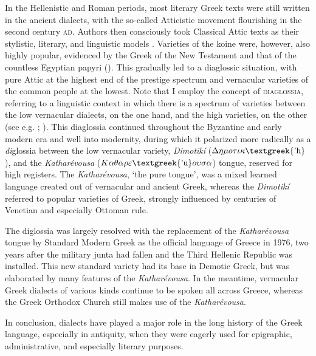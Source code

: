 \documentclass[output=paper]{langsci/langscibook}
\begin{document}
In the Hellenistic and Roman periods, most literary Greek texts were still written in the ancient dialects, with the so-called Atticistic movement flourishing in the second century \textsc{ad}. Authors then consciously took Classical Attic texts as their stylistic, literary, and linguistic models \citep[42]{Whitmarsh2005}. Varieties of the koine were, however, also highly popular, evidenced by the Greek of the New Testament and that of the countless Egyptian papyri (\citealt{EvansObbink2010}). This gradually led to a diaglossic situation, with pure Attic at the highest end of the prestige spectrum and vernacular varieties of the common people at the lowest. Note that I employ the concept of \textsc{diaglossia}, referring to a linguistic context in which there is a spectrum of varieties between the low vernacular dialects, on the one hand, and the high varieties, on the other (see e.g. \citealt{Auer2005}; \citealt{Rutten2016}). This diaglossia continued throughout the Byzantine and early modern era and well into modernity, during which it polarized more radically as a \textit{di}glossia between the low vernacular variety, \textit{Dimotikí} ($\Delta \eta \mu o\tau \iota \kappa \text{\textgreek{'h}}$), and the \textit{Katharévousa} ($K\alpha \theta \alpha \rho \varepsilon \text{\textgreek{'u}}o\upsilon \sigma \alpha $) tongue, reserved for high registers. The \textit{Katharévousa}, ‘the pure tongue’, was a mixed learned language created out of vernacular and ancient Greek, whereas the \textit{Dimotikí} referred to popular varieties of Greek, strongly influenced by centuries of Venetian and especially Ottoman rule.

The diglossia was largely resolved with the replacement of the \textit{Katharévousa} tongue by Standard Modern Greek as the official language of Greece in 1976, two years after the military junta had fallen and the Third Hellenic Republic was installed. This new standard variety had its base in Demotic Greek, but was elaborated by many features of the \textit{Katharévousa}. In the meantime, vernacular Greek dialects of various kinds continue to be spoken all across Greece, whereas the Greek Orthodox Church still makes use of the \textit{Katharévousa}.

In conclusion, dialects have played a major role in the long history of the Greek language, especially in antiquity, when they were eagerly used for epigraphic, administrative, and especially literary purposes.
\end{document}
